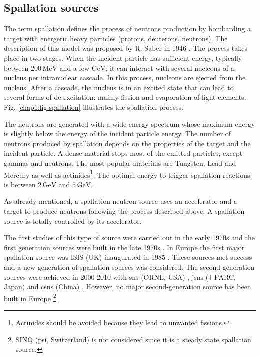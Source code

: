 \begin{refsection}
  \subsection{Spallation sources}
  The term spallation defines the process of neutrons production by bombarding a target with energetic heavy particles (protons, deuterons, neutrons). The description of this model was proposed by R. Saber in 1946 \cite{PhysRev.72.1114}. The process takes place in two stages. When the incident particle has sufficient energy, typically between $200\,\mathrm{MeV}$ and a few $\mathrm{GeV}$, it can interact with several nucleons of a nucleus per intranuclear cascade. In this process, nucleons are ejected from the nucleus. After a cascade, the nucleus is in an excited state that can lead to several forms of de-excitation: mainly fission and evaporation of light elements. Fig. \ref{chap1:fig:spallation} illustrates the spallation process.

  The neutrons are generated with a wide energy spectrum whose maximum energy is slightly below the energy of the incident particle energy. The number of neutrons produced by spallation depends on the properties of the target and the incident particle. %
  A dense material stops most of the emitted particles, except gammas and neutrons. The most popular materials are Tungsten, Lead and Mercury as well as actinides\footnote{Actinides should be avoided because they lead to unwanted fissions.}. The optimal energy to trigger spallation reactions is between $2\,\mathrm{GeV}$ and $5\,\mathrm{GeV}$.

  As already mentioned, a spallation neutron source uses an accelerator and a target to produce neutrons following the process described above. A spallation source is totally controlled by its accelerator.%

  The first studies of this type of source were carried out in the early 1970s and the first generation sources were built in the late 1970s \cite{klein1994}. In Europe the first major spallation source was ISIS (UK) inaugurated in 1985 \cite{THOMASON201961}. These sources met success and a new generation of spallation sources was considered. The second generation sources were achieved in 2000-2010 with \acrshort{sns} (ORNL, USA) \cite{Mason2005}, \acrshort{jsns} (J-PARC, Japan) \cite{Ikeda2002} and \acrshort{csns} (China) \cite{Chen2016}. However, no major second-generation source has been built in Europe \footnote{SINQ \cite{WAGNER2006541} (\acrshort{psi}, Switzerland) is not considered since it is a steady state spallation source.}.


\end{refsection}
